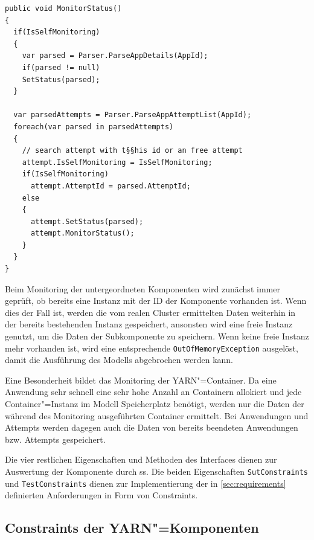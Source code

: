 \begin{lstlisting}[label=lst:monitorAppStatus,style=cs,
caption={[Implementierung der Methode MonitorStatus() in der Klasse YarnApp]
    Implementierung der Methode \texttt{MonitorStatus()} in der Klasse \texttt{YarnApp} (gekürzt).
    Das Monitoring der anderen Komponenten erfolgt analog hierzu.}]
public void MonitorStatus()
{
  if(IsSelfMonitoring)
  {
    var parsed = Parser.ParseAppDetails(AppId);
    if(parsed != null)
    SetStatus(parsed);
  }
  
  var parsedAttempts = Parser.ParseAppAttemptList(AppId);
  foreach(var parsed in parsedAttempts)
  {
    // search attempt with t§§his id or an free attempt
    attempt.IsSelfMonitoring = IsSelfMonitoring;
    if(IsSelfMonitoring)
      attempt.AttemptId = parsed.AttemptId;
    else
    {
      attempt.SetStatus(parsed);
      attempt.MonitorStatus();
    }
  }
}
\end{lstlisting}

Beim Monitoring der untergeordneten Komponenten wird zunächst immer geprüft, ob bereits eine Instanz mit der ID der Komponente vorhanden ist.
Wenn dies der Fall ist, werden die vom realen Cluster ermittelten Daten weiterhin in der bereits bestehenden Instanz gespeichert, ansonsten wird eine freie Instanz genutzt, um die Daten der Subkomponente zu speichern.
Wenn keine freie Instanz mehr vorhanden ist, wird eine entsprechende \texttt{OutOfMemoryException} ausgelöst, damit die Ausführung des Modells abgebrochen werden kann.

Eine Besonderheit bildet das Monitoring der YARN"=Container.
Da eine Anwendung sehr schnell eine sehr hohe Anzahl an Containern allokiert und jede Container"=Instanz im Modell Speicherplatz benötigt, werden nur die Daten der während des Monitoring ausgeführten Container ermittelt.
Bei Anwendungen und Attempts werden dagegen auch die Daten von bereits beendeten Anwendungen bzw. Attempts gespeichert.

Die vier restlichen Eigenschaften und Methoden des Interfaces dienen zur Auswertung der Komponente durch \gls{ss}.
Die beiden Eigenschaften \texttt{SutConstraints} und \texttt{TestConstraints} dienen zur Implementierung der in \cref{sec:requirements} definierten Anforderungen in Form von Constraints.

\subsection{Constraints der YARN"=Komponenten}
\label{subsec:yarnComponentConstraints}

